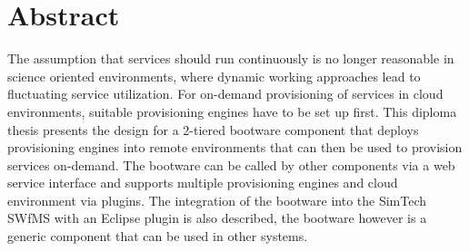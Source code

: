\chapter*{Abstract}

The assumption that services should run continuously is no longer reasonable in science oriented environments, where dynamic working approaches lead to fluctuating service utilization.
For on-demand provisioning of services in cloud environments, suitable provisioning engines have to be set up first.
This diploma thesis presents the design for a 2-tiered bootware component that deploys provisioning engines into remote environments that can then be used to provision services on-demand.
The bootware can be called by other components via a web service interface and supports multiple provisioning engines and cloud environment via plugins.
The integration of the bootware into the SimTech SWfMS with an Eclipse plugin is also described, the bootware however is a generic component that can be used in other systems.
